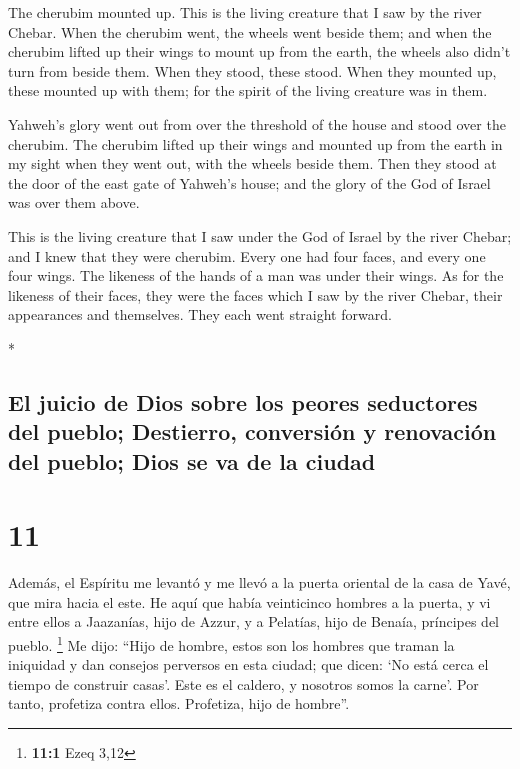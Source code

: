 \begin{paracol}{2}
\begin{otherlanguage}{english}
 The cherubim mounted up. This is the living creature
that I saw by the river Chebar.  When the cherubim went,
the wheels went beside them; and when the cherubim lifted up their wings
to mount up from the earth, the wheels also didn't turn from beside
them.  When they stood, these stood. When they mounted
up, these mounted up with them; for the spirit of the living creature
was in them.

 Yahweh's glory went out from over the threshold of the
house and stood over the cherubim.  The cherubim lifted
up their wings and mounted up from the earth in my sight when they went
out, with the wheels beside them. Then they stood at the door of the
east gate of Yahweh's house; and the glory of the God of Israel was over
them above.

 This is the living creature that I saw under the God of
Israel by the river Chebar; and I knew that they were cherubim.
 Every one had four faces, and every one four wings. The
likeness of the hands of a man was under their wings.  As
for the likeness of their faces, they were the faces which I saw by the
river Chebar, their appearances and themselves. They each went straight
forward.

\end{otherlanguage}

\switchcolumn[0]*

\hypertarget{el-juicio-de-dios-sobre-los-peores-seductores-del-pueblo-destierro-conversiuxf3n-y-renovaciuxf3n-del-pueblo-dios-se-va-de-la-ciudad}{%
\subsection{El juicio de Dios sobre los peores seductores del pueblo;
Destierro, conversión y renovación del pueblo; Dios se va de la
ciudad}\label{el-juicio-de-dios-sobre-los-peores-seductores-del-pueblo-destierro-conversiuxf3n-y-renovaciuxf3n-del-pueblo-dios-se-va-de-la-ciudad}}

\hypertarget{section-20}{%
\section{11}\label{section-20}}

 Además, el Espíritu me levantó y me llevó a la puerta
oriental de la casa de Yavé, que mira hacia el este. He aquí que había
veinticinco hombres a la puerta, y vi entre ellos a Jaazanías, hijo de
Azzur, y a Pelatías, hijo de Benaía, príncipes del pueblo. \footnote{\textbf{11:1}
  Ezeq 3,12}  Me dijo: ``Hijo de hombre, estos son los
hombres que traman la iniquidad y dan consejos perversos en esta ciudad;
 que dicen: `No está cerca el tiempo de construir casas'.
Este es el caldero, y nosotros somos la carne'.  Por
tanto, profetiza contra ellos. Profetiza, hijo de hombre''.


\end{paracol}
